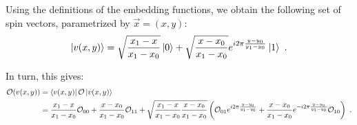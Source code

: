 \documentclass[draft,nofootinbib,pre,twocolumn,showkeys,superscriptaddress,preprintnumbers,floatfix]{revtex4-1}
\newcommand{\1}{\mathbbm{1}}
\begin{document}
Using the definitions of the embedding functions, we obtain the following set
of spin vectors, parametrized by $\vec{x} = (x,y)$:
\begin{align*}
\ket{v(x,y)} = \sqrt{\frac{x_1-x}{x_1-x_0}} \ket{0} + \sqrt{\frac{x-x_0}{x_1-x_0}}e^{i2 \pi \frac{y-y_0}{y_1-y_0}}\ket{1}
  ~.
\end{align*}
\begin{widetext}
In turn, this gives:
\begin{align*}
\mathcal{O}(v(x,y)) & = \bra{v(x,y)} \mathcal{O} \ket{v(x,y)} \\
  & = \frac{x_1-x}{x_1-x_0} \mathcal{O}_{00}  + \frac{x-x_0}{x_1-x_0}\mathcal{O}_{11} + \sqrt{\frac{x_1-x}{x_1-x_0}\frac{x-x_0}{x_1-x_0}}  \left(\mathcal{O}_{01} e^{i2\pi \frac{y-y_0}{y_1-y_0}} + \frac{x-x_0}{x_1-x_0} e^{-i2\pi \frac{y-y_0}{y_1-y_0}}\mathcal{O}_{10} \right)
  ~.
\end{align*}


\end{widetext}
\end{document}
